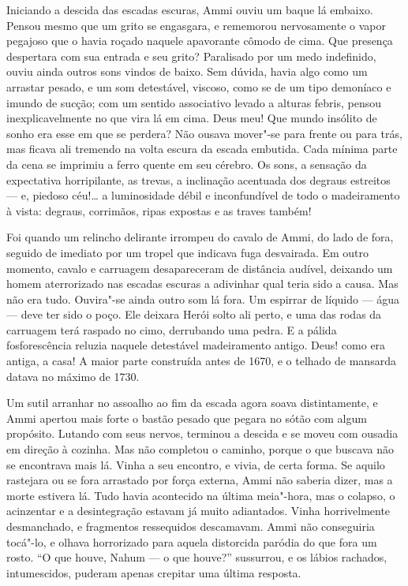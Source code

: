 Iniciando a descida das escadas escuras, Ammi ouviu um baque lá embaixo.
Pensou mesmo que um grito se engasgara, e rememorou nervosamente o vapor
pegajoso que o havia roçado naquele apavorante cômodo de cima. Que
presença despertara com sua entrada e seu grito? Paralisado por um medo
indefinido, ouviu ainda outros sons vindos de baixo. Sem dúvida, havia
algo como um arrastar pesado, e um som detestável, viscoso, como se de
um tipo demoníaco e imundo de sucção; com um sentido associativo levado
a alturas febris, pensou inexplicavelmente no que vira lá em cima. Deus
meu! Que mundo insólito de sonho era esse em que se perdera? Não ousava
mover"-se para frente ou para trás, mas ficava ali tremendo na volta
escura da escada embutida. Cada mínima parte da cena se imprimiu a ferro
quente em seu cérebro. Os sons, a sensação da expectativa horripilante,
as trevas, a inclinação acentuada dos degraus estreitos
--- e, piedoso céu!\ldots{} a
luminosidade débil e inconfundível de todo o madeiramento à vista:
degraus, corrimãos, ripas expostas e as traves também!

Foi quando um relincho delirante irrompeu do cavalo de Ammi, do lado de
fora, seguido de imediato por um tropel que indicava fuga desvairada. Em
outro momento, cavalo e carruagem desapareceram de distância audível,
deixando um homem aterrorizado nas escadas escuras a adivinhar qual
teria sido a causa. Mas não era tudo. Ouvira"-se ainda outro som lá fora.
Um espirrar de líquido --- água
--- deve ter sido o poço. Ele
deixara Herói solto ali perto, e uma das rodas da carruagem terá raspado
no cimo, derrubando uma pedra. E a pálida fosforescência reluzia naquele
detestável madeiramento antigo. Deus! como era antiga, a casa! A maior
parte construída antes de 1670, e o telhado de mansarda datava no máximo
de 1730.

Um sutil arranhar no assoalho ao fim da escada agora soava
distintamente, e Ammi apertou mais forte o bastão pesado que pegara no
sótão com algum propósito. Lutando com seus nervos, terminou a descida e
se moveu com ousadia em direção à cozinha. Mas não completou o caminho,
porque o que buscava não se encontrava mais lá. Vinha a seu encontro, e
vivia, de certa forma. Se aquilo rastejara ou se fora arrastado por
força externa, Ammi não saberia dizer, mas a morte estivera lá. Tudo
havia acontecido na última meia"-hora, mas o colapso, o acinzentar e a
desintegração estavam já muito adiantados. Vinha horrivelmente
desmanchado, e fragmentos ressequidos descamavam. Ammi não conseguiria
tocá"-lo, e olhava horrorizado para aquela distorcida paródia do que fora
um rosto. ``O que houve, Nahum --- o que houve?'' sussurrou, e os lábios
rachados, intumescidos, puderam apenas crepitar uma última resposta.

